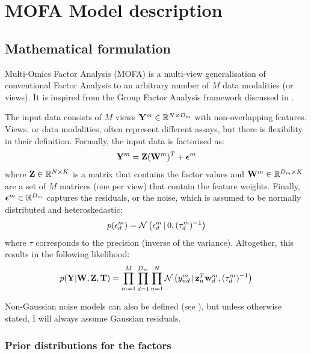\graphicspath{{Chapter2/Figs/}}

\section{MOFA Model description} \label{mofa:model_description}

\subsection{Mathematical formulation}

Multi-Omics Factor Analysis (MOFA) is a multi-view generalisation of conventional Factor Analysis to an arbitrary number of $M$ data modalities (or views). It is inspired from the Group Factor Analysis framework discussed in .

The input data consists of $M$ views ${\bf Y}^m \in \mathbb{R}^{N \times D_m}$ with non-overlapping features. Views, or data modalities, often represent different assays, but there is flexibility in their definition. Formally, the input data is factorised as:
\begin{equation} \label{mofa_master_equation}
	\mathbf{Y}^m = \mathbf{Z}(\mathbf{W}^{m})^{T} + \mbox{\boldmath $\epsilon$}^m
\end{equation}
where ${\bf Z} \in \mathbb{R}^{N \times K}$ is a matrix that contains the factor values and ${\bf W}^m \in \mathbb{R}^{D_m \times K}$ are a set of $M$ matrices (one per view) that contain the feature weights. Finally, $\mbox{\boldmath $\epsilon$}^m \in \mathbb{R}^{D_m}$ captures the residuals, or the noise, which is assumed to be normally distributed and heteroskedastic:
\begin{equation}
	p(\epsilon^{m}_{d}) = \mathcal{N}\left(\epsilon^{m}_{d} \,|\, 0,(\tau_{d}^{m})^{-1}\right)
\end{equation}
where $\tau$ corresponds to the precision (inverse of the variance). Altogether, this results in the following likelihood:
\begin{equation}
	p({\bf Y}|{\bf W},{\bf Z},\mbox{\boldmath $\mathrm{T}$}) = \prod_{m=1}^{M} \prod_{d=1}^{D_m} \prod_{n=1}^{N} \mathcal{N}\left(y_{nd}^m \,|\, {\bf z}_{n}^T{\bf w}_{d}^{m},(\tau_d^m)^{-1}\right)
\end{equation}

Non-Gaussian noise models can also be defined (see ), but unless otherwise stated, I will always assume Gaussian residuals.

\subsubsection{Prior distributions for the factors}  \label{section:mofa_factors}

